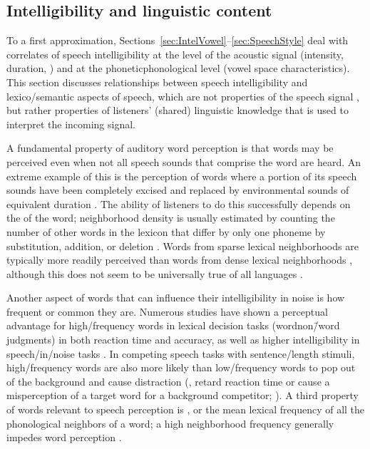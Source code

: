 \subsection{Intelligibility and linguistic content\label{sec:IntelLingContent}}
To a first approximation, Sections~\ref{sec:IntelVowel}–\ref{sec:SpeechStyle} deal with correlates of speech intelligibility at the level of the acoustic signal (intensity, duration, \fo) and at the phonetic\slsh phonological level (vowel space characteristics).  This section discusses relationships between speech intelligibility and lexico\-/semantic aspects of speech, which are not properties of the speech signal \perse, but rather properties of listeners’ (shared) linguistic knowledge that is used to interpret the incoming signal.

A fundamental property of auditory word perception is that words may be perceived even when not all speech sounds that comprise the word are heard.  An extreme example of this is the perception of words where a portion of its speech sounds have been completely excised and replaced by environmental sounds of equivalent duration \citep{Warren1970}.  The ability of listeners to do this successfully depends on the  of the word; neighborhood density is usually estimated by counting the number of other words in the lexicon that differ by only one phoneme by substitution, addition, or deletion \citep{LucePisoni1998}.  Words from sparse lexical neighborhoods are typically more readily perceived than words from dense lexical neighborhoods \citep{VitevitchLuce1998, ZieglerEtAl2003}, although this does not seem to be universally true of all languages \citep{VitevitchRodriguez2005}.%

Another aspect of words that can influence their intelligibility in noise is how frequent or common they are.  Numerous studies have shown a perceptual advantage for high\-/frequency words in lexical decision tasks (word\slsh non\=/word judgments) in both reaction time and accuracy, as well as higher intelligibility in speech\-/in\-/noise tasks \citep[\eg,][]{Howes1957, Savin1963, VitevitchLuce1998, DirksEtAl2001, TakayanagiEtAl2002, VitevitchRodriguez2005}.  In competing speech tasks with sentence\-/length stimuli, high\-/frequency words are also more likely than low\-/frequency words to pop out of the background and cause distraction (\ie, retard reaction time or cause a misperception of a target word for a background competitor; \citealt{BoulengerEtAl2010}).  A third property of words relevant to speech perception is , or the mean lexical frequency of all the phonological neighbors of a word; a high neighborhood frequency generally impedes word perception \citep{LucePisoni1998}.  

